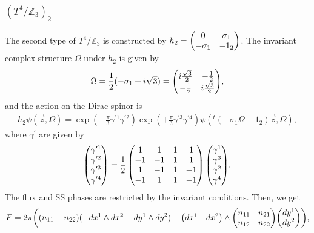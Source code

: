 \documentclass[11pt]{article}
\begin{document}
\subsubsection{$(T^4/ \mathbb{Z}_3)_2$}
The second type of $T^4/ \mathbb{Z}_3$ is constructed by $h_2=\mqty( 0 & \sigma_1 \\ -\sigma_1 & -1_2)$. The invariant complex structure $\Omega$ under $h_2$ is given by
\begin{align}
    \Omega= \frac{1}{2}(- \sigma_1 + i \sqrt{3} )= \mqty(i\frac{\sqrt{3}}{2} & -\frac{1}{2} \\ -\frac{1}{2} & i\frac{\sqrt{3}}{2}),
\end{align}
and the action on the Dirac spinor is 
\begin{align}
    h_2\psi (\vec{z},\Omega)= \exp( -\frac{\pi}{3} \gamma^{\prime1} \gamma^{\prime2}) \exp(+\frac{\pi}{3} \gamma^{\prime3} \gamma^{\prime4})\psi( {}^t(-\sigma_1 \Omega-1_2)\vec{z},\Omega), 
\end{align}
where $\gamma^{\prime}$ are given by
\begin{align}
    \mqty( \gamma^{\prime 1} \\ \gamma^{\prime 2} \\ \gamma^{\prime 3} \\ \gamma^{\prime 4})= \frac{1}{2}\left(\begin{matrix}1 & 1 & 1 & 1\\-1 & -1 & 1 & 1\\1 & -1 & 1 & -1\\-1 & 1 & 1 & -1\end{matrix}\right) \mqty( \gamma^{1} \\ \gamma^{ 3} \\ \gamma^{2} \\ \gamma^{ 4}). %
    \end{align}
The flux and SS phases are restricted by the invariant conditions. Then, we get
\begin{align}
    F= 2\pi \qty( (n_{11}- n_{22}) (-dx^1 \wedge dx^2 +dy^1 \wedge dy^2 )+ \mqty(dx^1 & dx^2) \wedge \mqty(n_{11} & n_{21} \\ n_{12}  & n_{22})  \mqty(dy^1 \\ dy^2 )),
\end{align}
\end{document}

